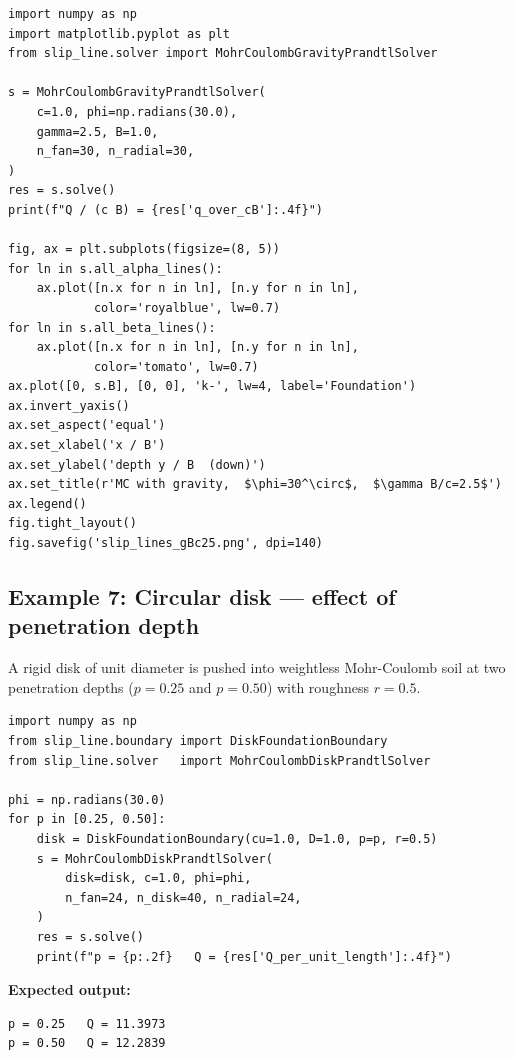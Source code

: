 \documentclass[11pt,a4paper]{article}
\begin{document}
\begin{lstlisting}
import numpy as np
import matplotlib.pyplot as plt
from slip_line.solver import MohrCoulombGravityPrandtlSolver

s = MohrCoulombGravityPrandtlSolver(
    c=1.0, phi=np.radians(30.0),
    gamma=2.5, B=1.0,
    n_fan=30, n_radial=30,
)
res = s.solve()
print(f"Q / (c B) = {res['q_over_cB']:.4f}")

fig, ax = plt.subplots(figsize=(8, 5))
for ln in s.all_alpha_lines():
    ax.plot([n.x for n in ln], [n.y for n in ln],
            color='royalblue', lw=0.7)
for ln in s.all_beta_lines():
    ax.plot([n.x for n in ln], [n.y for n in ln],
            color='tomato', lw=0.7)
ax.plot([0, s.B], [0, 0], 'k-', lw=4, label='Foundation')
ax.invert_yaxis()
ax.set_aspect('equal')
ax.set_xlabel('x / B')
ax.set_ylabel('depth y / B  (down)')
ax.set_title(r'MC with gravity,  $\phi=30^\circ$,  $\gamma B/c=2.5$')
ax.legend()
fig.tight_layout()
fig.savefig('slip_lines_gBc25.png', dpi=140)
\end{lstlisting}

\subsection{Example 7: Circular disk — effect of penetration depth}
\label{ex:disk}

A rigid disk of unit diameter is pushed into weightless Mohr-Coulomb
soil at two penetration depths ($p = 0.25$ and $p = 0.50$) with
roughness $r = 0.5$.

\begin{lstlisting}
import numpy as np
from slip_line.boundary import DiskFoundationBoundary
from slip_line.solver   import MohrCoulombDiskPrandtlSolver

phi = np.radians(30.0)
for p in [0.25, 0.50]:
    disk = DiskFoundationBoundary(cu=1.0, D=1.0, p=p, r=0.5)
    s = MohrCoulombDiskPrandtlSolver(
        disk=disk, c=1.0, phi=phi,
        n_fan=24, n_disk=40, n_radial=24,
    )
    res = s.solve()
    print(f"p = {p:.2f}   Q = {res['Q_per_unit_length']:.4f}")
\end{lstlisting}

\textbf{Expected output:}
\begin{lstlisting}[numbers=none]
p = 0.25   Q = 11.3973
p = 0.50   Q = 12.2839
\end{lstlisting}
\end{document}
